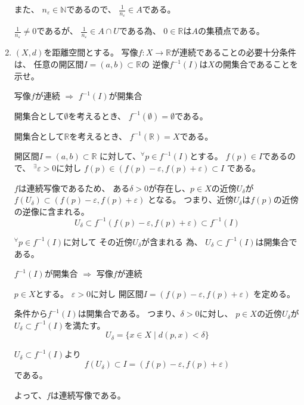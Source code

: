 \documentclass[12pt,b5paper]{ltjsarticle}
\begin{document}
\begin{enumerate}
      また、
      $n_\varepsilon \in \mathbb{N}$であるので、
      $\frac{1}{n_\varepsilon} \in A$である。

      $\frac{1}{n_\varepsilon} \ne 0$であるが、
      $\frac{1}{n_\varepsilon} \in A\cap U$である為、
      $0\in\mathbb{R}$は$A$の集積点である。



\hrulefill
 \item
      $(X,d)$を距離空間とする。
      写像$f:X\to\mathbb{R}$が連続であることの必要十分条件は、
      任意の開区間$I=(a,b)\subset\mathbb{R}$の
      逆像$f^{-1}(I)$は$X$の開集合であることを示せ。

\dotfill

      \dotfill
      写像$f$が連続
      $\Rightarrow$
      $f^{-1}(I)$が開集合
      \dotfill

      開集合として$\emptyset$を考えるとき、
      $f^{-1}(\emptyset)=\emptyset$である。

      開集合として$\mathbb{R}$を考えるとき、
      $f^{-1}(\mathbb{R})=X$である。


      開区間$I=(a,b)\subset\mathbb{R}$
      に対して、${}^{\forall}p\in f^{-1}(I)$とする。
      $f(p)\in I$であるので、
      ${}^{\exists}\varepsilon >0$に対し
      $f(p)\in (f(p)-\varepsilon , f(p)+\varepsilon ) \subset I$
      である。

      $f$は連続写像であるため、
      ある$\delta >0$が存在し、$p\in X$の近傍$U_\delta$が
      $f(U_\delta) \subset (f(p)-\varepsilon , f(p)+\varepsilon)$
      となる。
      つまり、近傍$U_\delta$は$f(p)$の近傍の逆像に含まれる。
      \begin{equation}
       U_\delta \subset f^{-1}(f(p)-\varepsilon , f(p)+\varepsilon)
        \subset f^{-1}(I)
      \end{equation}

      ${}^{\forall}p\in f^{-1}(I)$に対して
      その近傍$U_\delta$が含まれる
      為、
      $U_\delta \subset f^{-1}(I)$は開集合である。


      \dotfill
      $f^{-1}(I)$が開集合
      $\Rightarrow$
      写像$f$が連続
      \dotfill


      $p\in X$とする。
      $\varepsilon>0$に対し
      開区間$I=(f(p)-\varepsilon , f(p)+\varepsilon)$
      を定める。

      条件から$f^{-1}(I)$は開集合である。
      つまり、$\delta>0$に対し、
      $p\in X$の近傍$U_\delta$が$U_\delta \subset f^{-1}(I)$を満たす。
      \begin{equation}
       U_\delta = \{ x\in X \mid d(p,x)<\delta \}
      \end{equation}

      $U_\delta \subset f^{-1}(I)$より
      \begin{equation}
       f(U_\delta) \subset I = (f(p)-\varepsilon , f(p)+\varepsilon)
      \end{equation}
      である。

      よって、$f$は連続写像である。





\hrulefill

\end{enumerate}

\hrulefill
\end{document}
